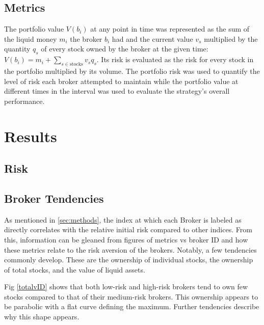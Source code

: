 \documentclass[letterpaper, 10 pt, proceedings]{ieeetran}
\begin{document}
	\subsection{Metrics}\label{subsec:metrics}	
	The portfolio value $V(b_i)$ at any point in time was represented as the sum of the liquid money $m_i$ the broker $b_i$ had and the current value $v_s$ multiplied by the quantity $q_s$ of every stock owned by the broker at the given time: $V(b_i) = m_i + \sum\limits_{s\in\text{stocks}} v_s q_s$. Its risk is evaluated as the risk for every stock in the portfolio multiplied by its volume. The portfolio risk was used to quantify the level of risk each broker attempted to maintain while the portfolio value at different times in the interval was used to evaluate the strategy's overall performance.


	\section{Results}\label{sec:results}
	
	\subsection{Risk}
	
	\subsection{Broker Tendencies}\label{subsec:tendencies}	
	As mentioned in \ref{sec:methods}, the index at which each Broker is labeled as directly correlates with the relative initial risk compared to other indices. From this, information can be gleaned from figures of metrics vs broker ID and how these metrics relate to the risk aversion of the brokers. Notably, a few tendencies commonly develop. These are the ownership of individual stocks, the ownership of total stocks, and the value of liquid assets.\par 
	Fig \ref{totalvID} shows that both low-risk and high-risk brokers tend to own few stocks compared to that of their medium-risk brokers. This ownership appears to be parabolic with a flat curve defining the maximum. Further tendencies describe why this shape appears. \par
\end{document}
